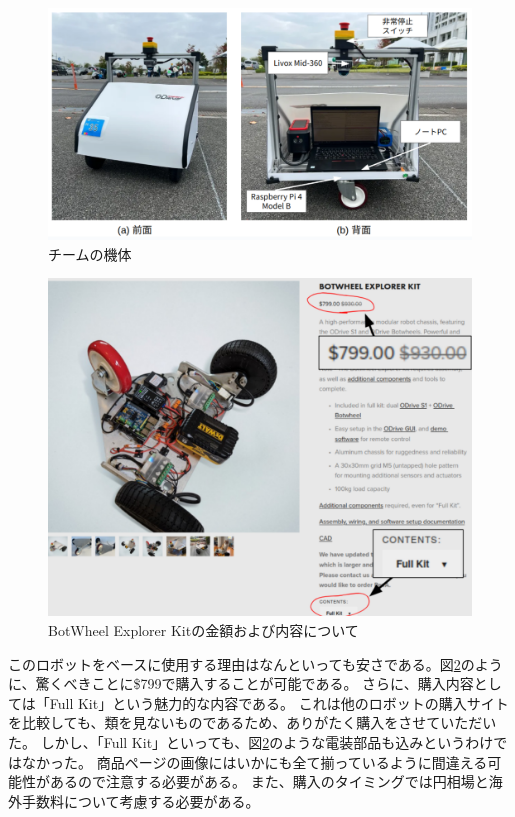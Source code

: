 \documentclass[twocolumn,9pt]{jsproceedings}
\begin{document}
\begin{figure}[h]
  \begin{center}
    \includegraphics[width=1.0\linewidth]{figs/0_robot.pdf}
    \caption{チームの機体}
    \label{fig:robot}
  \end{center}
\end{figure}

\begin{figure}[h]
  \begin{center}
    \includegraphics[width=0.8\linewidth]{figs/b_kit_price.pdf}
    \caption{BotWheel Explorer Kitの金額および内容について}
    \label{fig:b_robot_price}
  \end{center}
\end{figure}

このロボットをベースに使用する理由はなんといっても安さである。図\ref{fig:b_robot_price}のように、驚くべきことに\$799で購入することが可能である。
さらに、購入内容としては「Full Kit」という魅力的な内容である。
これは他のロボットの購入サイトを比較しても、類を見ないものであるため、ありがたく購入をさせていただいた。
しかし、「Full Kit」といっても、図\ref{fig:b_robot_price}のような電装部品も込みというわけではなかった。
商品ページの画像にはいかにも全て揃っているように間違える可能性があるので注意する必要がある。
また、購入のタイミングでは円相場と海外手数料について考慮する必要がある。
\end{document}
